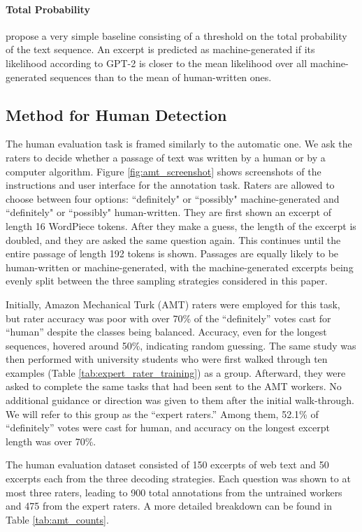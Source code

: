 \paragraph{Total Probability}
\citet{solaiman2019release} propose a very simple baseline consisting of a threshold on the total probability of the text sequence.
An excerpt is predicted as machine-generated if its likelihood according to GPT-2 is closer to the mean likelihood over all machine-generated sequences than to the mean of human-written ones.

\subsection{Method for Human Detection}
The human evaluation task is framed similarly to the automatic one.
We ask the raters to decide whether a passage of text was written by a human or by a computer algorithm.
Figure \ref{fig:amt_screenshot} shows screenshots of the instructions and user interface for the annotation task.
Raters are allowed to choose between four options: ``definitely" or ``possibly" machine-generated and  ``definitely" or ``possibly" human-written.
They are first shown an excerpt of length 16 WordPiece tokens.
After they make a guess, the length of the excerpt is doubled, and they are asked the same question again.
This continues until the entire passage of length 192 tokens is shown.
Passages are equally likely to be human-written or machine-generated, with the machine-generated excerpts being evenly split between the three sampling strategies considered in this paper.

Initially, Amazon Mechanical Turk (AMT) raters were employed for this task, but rater accuracy was poor with over 70\% of the ``definitely'' votes cast for ``human'' despite the classes being balanced.
Accuracy, even for the longest sequences, hovered around 50\%, indicating random guessing.
The same study was then performed with university students who were first walked through ten examples (Table \ref{tab:expert_rater_training}) as a group.
Afterward, they were asked to complete the same tasks that had been sent to the AMT workers.
No additional guidance or direction was given to them after the initial walk-through.
We will refer to this group as the ``expert raters.''
Among them, 52.1\% of ``definitely'' votes were cast for human, and accuracy on the longest excerpt length was over 70\%.

The human evaluation dataset consisted of 150 excerpts of web text and 50 excerpts each from the three decoding strategies.
Each question was shown to at most three raters, leading to 900 total annotations from the untrained workers and 475 from the expert raters.
A more detailed breakdown can be found in Table \ref{tab:amt_counts}.


